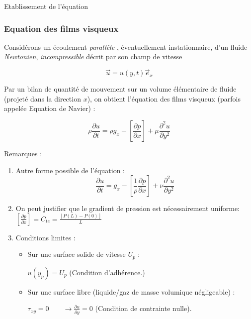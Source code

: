 \begin{frame}{Etablissement de l'équation}
\subsubsection{Equation des films visqueux}



\bigskip
\small
Considérons un écoulement {\em parallèle} , éventuellement instationnaire, 
d'un fluide {\em Newtonien}, {\em incompressible } décrit par son champ de vitesse 

$$ 
\vec{u} = u(y,t) \vec{e}_x 
$$


\pause
\medskip 

Par un bilan de quantité de mouvement  sur un volume élémentaire de fluide (projeté dans la direction $x$), on obtient l'équation des films visqueux 
(parfois appelée Equation de Navier) :


$$
\rho \frac{\partial u}{\partial t} = \rho g_x - \left[ \frac{\partial p}{\partial x} \right] + \mu \frac{\partial^2 u}{\partial y^2} 
$$ 

\pause
\medskip 

Remarques :
\begin{enumerate}

\item Autre forme possible de l'équation :
$$
\frac{\partial u}{\partial t} = g_x - \left[ \frac{1}{\rho} \frac{\partial p}{\partial x} \right] + \nu \frac{\partial^2 u}{\partial y^2} 
$$ 


\item On peut justifier que le gradient de pression est nécessairement uniforme:
 $\left[ \frac{\partial p}{\partial x} \right] = C_{te} = \frac{[P(L)-P(0)]}{L}$ \qquad {\color{vert} [Démonstration :]}
  


\item
Conditions limites :

\begin{itemize} 
\item Sur une surface solide de vitesse $U_p$ :

$ u(y_p) = U_p$ (Condition d'adhérence.) 

\item Sur une surface libre (liquide/gaz de masse volumique négligeable) :

$\tau_{xy} = 0  \qquad \rightarrow \frac{\partial u}{\partial y} = 0$ (Condition de contrainte nulle).


\end{itemize}

\end{enumerate}



\end{frame}



